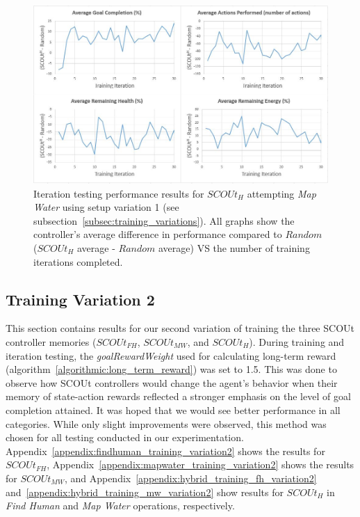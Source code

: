 \begin{appx}
\begin{figure}[H]
  \includegraphics[width=0.9\columnwidth]{Figures/Results/TrainingVariation1/Hybrid-MapWater.JPG}
  \caption{Iteration testing performance results for $SCOUt_{H}$ attempting \textit{Map Water} using setup variation 1 (see subsection~\ref{subsec:training_variations}). All graphs show the controller's average difference in performance compared to $Random$ ($SCOUt_{H}$ average - $Random$ average) VS the number of training iterations completed.}
  \label{appendix:hybrid_training_mw_variation1}
\end{figure}
\end{appx}



\subsection{Training Variation 2}
This section contains results for our second variation of training the three SCOUt controller memories ($SCOUt_{FH}$, $SCOUt_{MW}$, and $SCOUt_{H}$).
During training and iteration testing, the \textit{goalRewardWeight} used for calculating long-term reward (algorithm~\ref{algorithmic:long_term_reward}) was set to 1.5.
This was done to observe how SCOUt controllers would change the agent's behavior when their memory of state-action rewards reflected a stronger emphasis on the level of goal completion attained.
It was hoped that we would see better performance in all categories.
While only slight improvements were observed, this method was chosen for all testing conducted in our experimentation.
Appendix~\ref{appendix:findhuman_training_variation2} shows the results for $SCOUt_{FH}$, Appendix~\ref{appendix:mapwater_training_variation2} shows the results for $SCOUt_{MW}$, and Appendix~\ref{appendix:hybrid_training_fh_variation2} and~\ref{appendix:hybrid_training_mw_variation2} show results for $SCOUt_{H}$ in \textit{Find Human} and \textit{Map Water} operations, respectively.

